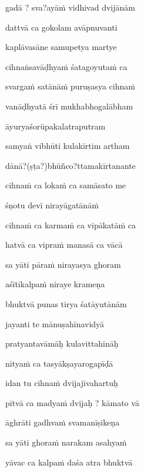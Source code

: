 \ujvers\nemsloka 
gadā ? sva?ayāṁ vidhivad dvijānām
\dontdisplaylinenum

\nemslokab 
dattvā ca gokolam avāpnuvanti \danda\dontdisplaylinenum

\nemslokac 
kaplāvasāne samupetya martye
\dontdisplaylinenum

\nemslokad 
cihnaṅsavāḍhyaṁ śatagoyutaṁ ca \veg\dontdisplaylinenum

\ujvers\nemsloka 
svargaṁ satānāṁ puruṣasya cihnaṁ
\dontdisplaylinenum

\nemslokab 
vanāḍhyatā śrī mukhabhogalābham \danda\dontdisplaylinenum

\nemslokac 
āyuryaśorūpakalatraputram
\dontdisplaylinenum

\nemslokad 
samyaṅ vibhūti kulakīrtim artham \veg\dontdisplaylinenum

\ujvers\nemsloka 
dānā?(ṣṭa?)bhūñco?ttamakīrtanante
\dontdisplaylinenum

\nemslokab 
cihnaṁ ca lokaṁ ca samāsato me \danda\dontdisplaylinenum

\nemslokac 
śṇotu devī nirayāgatānāṁ
\dontdisplaylinenum

\nemslokad 
cihnaṁ ca karmaṁ ca vipākatāṁ ca \veg\dontdisplaylinenum

\ujvers\nemsloka 
hatvā ca vipraṁ manasā ca vācā
\dontdisplaylinenum

\nemslokab 
sa yāti pāraṁ nirayasya ghoram \danda\dontdisplaylinenum

\nemslokac 
aśītikalpaṁ niraye krameṇa
\dontdisplaylinenum

\nemslokad 
bhuktvā punas tirya śatāyutānām \veg\dontdisplaylinenum

\ujvers\nemsloka 
jayanti te mānuṣahīnavidyā
\dontdisplaylinenum

\nemslokab 
pratyantavāmāḥ kulavittahīnāḥ \danda\dontdisplaylinenum

\nemslokac 
nityaṁ ca tasyākṣayarogapīḍā
\dontdisplaylinenum

\nemslokad 
idan tu cihnaṁ dvijajīvahartuḥ \veg\dontdisplaylinenum

\ujvers\nemsloka 
pītvā ca madyaṁ dvijaḥ ? kāmato vā
\dontdisplaylinenum

\nemslokab 
āghrāti gadhvaṁ svamanīṣikeṇa \danda\dontdisplaylinenum

\nemslokac 
sa yāti ghoraṁ narakam asahyaṁ
\dontdisplaylinenum

\nemslokad 
yāvac ca kalpaṁ daśa atra bhuktvā \veg\dontdisplaylinenum

